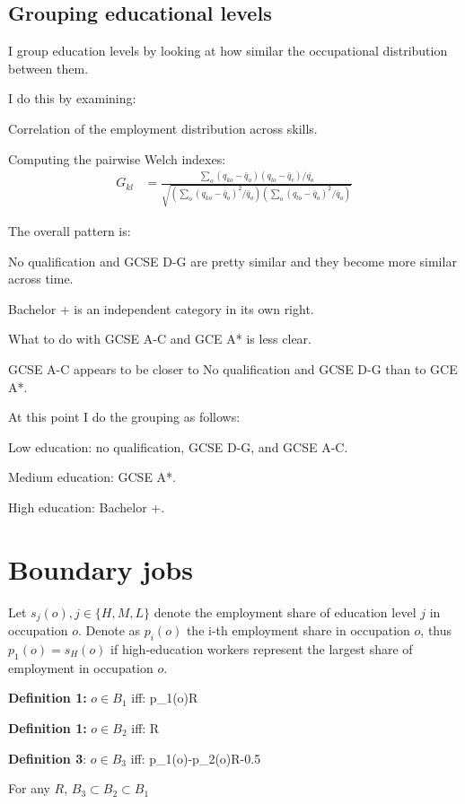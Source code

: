 \documentclass[a4paper, 12pt]{article}
\begin{document}
\subsection{Grouping educational levels}
\bitem
\item I group education levels by looking at how similar the occupational distribution between them.
\item I do this by examining:
\bitem
	\item Correlation of the employment distribution across skills.
	\item Computing the pairwise Welch indexes:
	\begin{align*}
		G_{kl}&=\frac{\sum_o(q_{ko}-\bar{q}_{o})(q_{lo}-\bar{q}_{c})/\bar{q_o}}{\sqrt{(\sum_o(q_{ko}-\bar{q}_o)^2/\bar{q}_o)(\sum_o(q_{lo}-\bar{q}_o)^2/\bar{q}_o)}}
	\end{align*}
\eitem
\item The overall pattern is:
\bitem
	\item No qualification and GCSE D-G are pretty similar and they become more similar across time.
	\item Bachelor + is an independent category in its own right.
	\item	What to do with GCSE A-C and GCE A* is less clear. 
	\bitem
		\item GCSE A-C appears to be closer to No qualification and  GCSE D-G than to GCE A*.
	\eitem
\eitem
 \item At this point I do the grouping as follows:
 \bitem 
 	\item Low education: no qualification,  GCSE D-G, and  GCSE A-C.
 	\item Medium education:  GCSE A*.
 	\item High education: Bachelor +.
\eitem




\eitem
\section{Boundary jobs}
	Let $s_{j}(o), j\in\{H,M,L\}$ denote the employment share of education level $j$ in occupation $o$. Denote as $p_i(o)$ the i-th employment share in occupation $o$, thus $p_1(o)=s_{H}(o)$ if high-education workers represent the largest share of employment in occupation $o$.
\bitem
	\item \textbf{Definition 1:} $o\in B_1$ iff:
	\beqns
	p_1(o)\leq R
	\eeqns
	\item \textbf{Definition 1:} $o\in B_2$ iff:
	\beqns
	\leq R
	\eeqns
	\item \textbf{Definition 3}: $o\in B_3$ iff:
	\beqns
		p_1(o)-p_2(o)\leq R-0.5
	\eeqns
	\item For any $R$, $B_3\subset B_2\subset B_1$
\eitem
\end{document}
